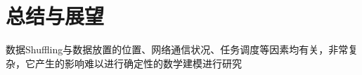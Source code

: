 \chapter{总结与展望}
\label{chp:future}


数据Shuffling与数据放置的位置、网络通信状况、任务调度等因素均有关，非常复杂，它产生的影响难以进行确定性的数学建模进行研究
